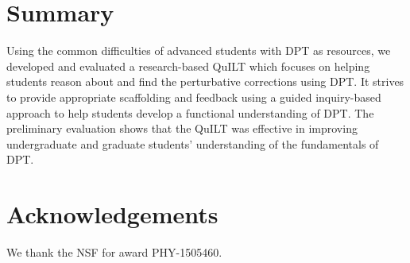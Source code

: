 \documentclass[aps,pra,showpacs,showkeys,twocolumn,groupedaddress]{revtex4-1}
\begin{document}
\vspace*{-.2in}
\section{Summary}
\vspace*{-.1in}
Using the common difficulties of advanced students with DPT as resources, we developed and evaluated a research-based QuILT which focuses on helping students reason about and find the perturbative corrections using DPT.
It strives to provide appropriate scaffolding and feedback using a guided inquiry-based approach to help students develop a functional understanding of DPT.  The preliminary evaluation shows that the QuILT was effective in improving undergraduate and graduate students' understanding of the fundamentals of DPT.  

\vspace*{-.2in}
\section*{Acknowledgements}
\vspace*{-.1in}
We thank the NSF for award PHY-1505460.
\vspace*{-.27in} 

% 
\end{document}
